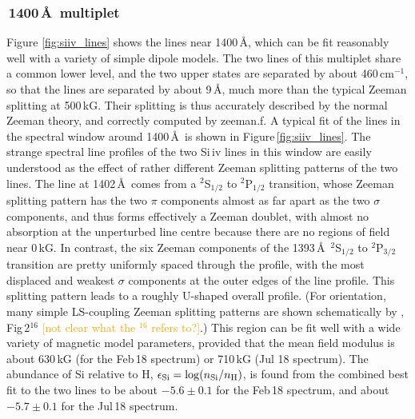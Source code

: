 \documentclass[fleqn,usenatbib]{mnras}
\newcommand{\bgc}[1]{\textcolor{orange}{[#1]}}
\begin{document}
\subsubsection{\,1400\,\AA\ multiplet}
\label{sec: siiv}
Figure \ref{fig:siiv_lines} shows the  lines near 1400\,\AA, which can be fit reasonably well with a variety of simple dipole models. The two lines of this multiplet share a common lower level, and the two upper states are separated by about 460\,cm$^{-1}$, so that the lines are separated by about 9\,\AA, much more than the typical Zeeman splitting at 500\,kG. Their splitting is thus accurately described by the normal Zeeman theory, and correctly computed by {\sc zeeman.f}. A typical fit of the lines in the spectral window around 1400\,\AA\ is shown in Figure\,\ref{fig:siiv_lines}. The strange spectral line profiles of the two Si\,{\sc iv} lines in this window are easily understood as the effect of rather different Zeeman splitting patterns of the two lines. The line at 1402\,\AA\ comes from a $^2$S$_{1/2}$ to $^2$P$_{1/2}$ transition, whose Zeeman splitting pattern has the two $\pi$ components almost as far apart as the two $\sigma$ components, and thus forms effectively a Zeeman doublet, with almost no absorption at the unperturbed line centre because there are no regions of field near 0\,kG. In contrast, the six Zeeman components of the 1393\,\AA\ $^2$S$_{1/2}$ to $^2$P$_{3/2}$ transition are pretty uniformly spaced through the profile, with the most displaced and weakest $\sigma$ components at the outer edges of the line profile.  This splitting pattern leads to a roughly U-shaped overall profile. (For orientation, many simple LS-coupling Zeeman splitting patterns are shown schematically by \citealt{condon+shortley35-1}, Fig\,2$^{16}$ \bgc{not clear what the ${}^{16}$ refers to?}.) This region can be fit well with a wide variety of magnetic model parameters, provided that the mean field modulus is about 630\,kG (for the Feb\,18 spectrum) or 710\,kG (Jul 18 spectrum). The abundance of Si relative to H, $\epsilon_{\rm Si} = \log(n_{\rm Si}/n_{\rm H})$, is found from the combined best fit to the two lines to be about $-5.6 \pm 0.1$ for the Feb\,18 spectrum, and about $-5.7 \pm 0.1$ for the Jul\,18 spectrum.
\end{document}
